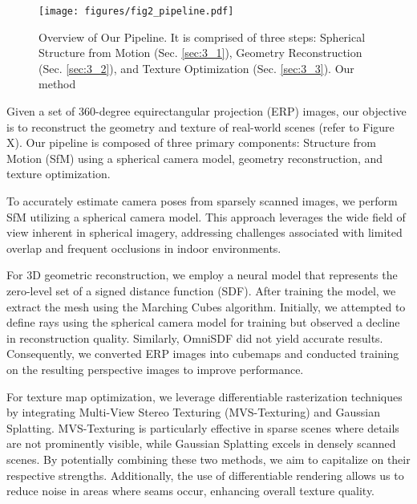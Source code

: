 \begin{figure}[h]
    \centering
    \texttt{[image: figures/fig2\_pipeline.pdf]}
    \caption{Overview of Our Pipeline. It is comprised of three steps: Spherical Structure from Motion (Sec. \ref{sec:3_1}), Geometry Reconstruction (Sec. \ref{sec:3_2}), and Texture Optimization (Sec. \ref{sec:3_3}). Our method }
    \label{fig:pipeline}
\end{figure}
Given a set of 360-degree equirectangular projection (ERP) images, our objective is to reconstruct the geometry and texture of real-world scenes (refer to Figure X). 
Our pipeline is composed of three primary components: Structure from Motion (SfM) using a spherical camera model, geometry reconstruction, and texture optimization.

To accurately estimate camera poses from sparsely scanned images, we perform SfM utilizing a spherical camera model. 
This approach leverages the wide field of view inherent in spherical imagery, addressing challenges associated with limited overlap and frequent occlusions in indoor environments.

For 3D geometric reconstruction, we employ a neural model that represents the zero-level set of a signed distance function (SDF). 
After training the model, we extract the mesh using the Marching Cubes algorithm. 
Initially, we attempted to define rays using the spherical camera model for training but observed a decline in reconstruction quality. 
Similarly, OmniSDF did not yield accurate results. 
Consequently, we converted ERP images into cubemaps and conducted training on the resulting perspective images to improve performance.

For texture map optimization, we leverage differentiable rasterization techniques by integrating Multi-View Stereo Texturing (MVS-Texturing) and Gaussian Splatting. 
MVS-Texturing is particularly effective in sparse scenes where details are not prominently visible, while Gaussian Splatting excels in densely scanned scenes. 
By potentially combining these two methods, we aim to capitalize on their respective strengths. 
Additionally, the use of differentiable rendering allows us to reduce noise in areas where seams occur, enhancing overall texture quality.